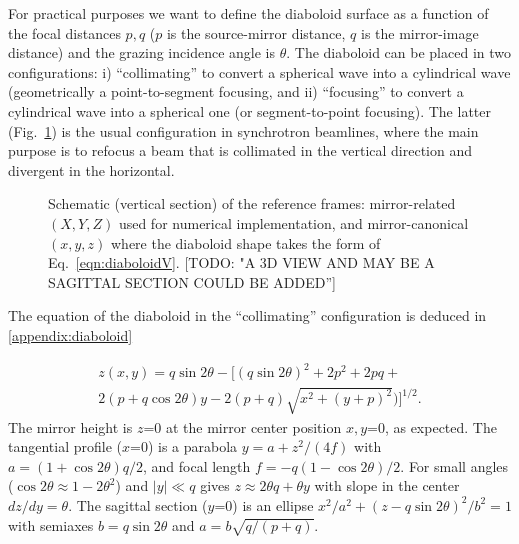 \documentclass{iucr}              %
\newcommand{\todo}[1]{{\color{red}[TODO: "#1'']}}
\begin{document}
For practical purposes we want to define the diaboloid surface as a function of the focal distances $p,q$ ($p$ is the source-mirror distance, $q$ is the mirror-image distance) and the grazing incidence angle is $\theta$. The diaboloid can be placed in two configurations: i) ``collimating'' to convert a spherical wave into a cylindrical wave (geometrically a point-to-segment focusing, and ii) ``focusing'' to convert a cylindrical wave into a spherical one (or segment-to-point focusing). The latter (Fig.~\ref{fig:frame}) is the usual configuration in synchrotron beamlines, where the main purpose is to refocus a beam that is collimated in the vertical direction and divergent in the horizontal. 



\begin{figure}\label{fig:frame}



\caption{Schematic (vertical section) of the reference frames: mirror-related $(X,Y,Z)$ used for numerical implementation, and mirror-canonical $(x,y,z)$ where the diaboloid shape takes the form of Eq.~\ref{eqn:diaboloidV}. \todo{A 3D VIEW AND MAY BE A SAGITTAL SECTION COULD BE ADDED}}
\end{figure}



The equation of the diaboloid in the ``collimating'' configuration is deduced in \ref{appendix:diaboloid}

\begin{multline}
\label{eqn:diaboloidV}
z(x,y) = q \sin2\theta - 
[ (q \sin{2\theta})^2 + 2p^2 + 2 p q + \\
2 (p + q \cos{2\theta}) y - 
2 (p+q)  \sqrt{x^2 + (y + p)^2}) 
]^{1/2}.
\end{multline}
The mirror height is $z$=0 at the mirror center position $x, y$=0, as expected. The tangential profile ($x$=0) is a parabola $y=a + z^2/(4f)$ with  $a=(1+\cos2\theta)q/2$, and focal length $ f = -q (1-\cos2\theta) /2$. For small angles ($\cos2\theta\approx 1 - 2\theta^2$) and $|y|\ll q$ gives $z\approx 2 \theta q + \theta y$ with slope in the center $dz/dy=\theta$. The sagittal section ($y$=0) is an ellipse $x^2/a^2 + (z - q \sin2\theta)^2/b^2=1$ with semiaxes $b=q \sin2\theta$ and $a=b \sqrt{q /(p+q)}$. 
\end{document}
